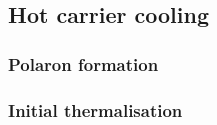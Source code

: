 \subsection{Hot carrier cooling}

% 

\subsubsection{Polaron formation}

\subsubsection{Initial thermalisation}




